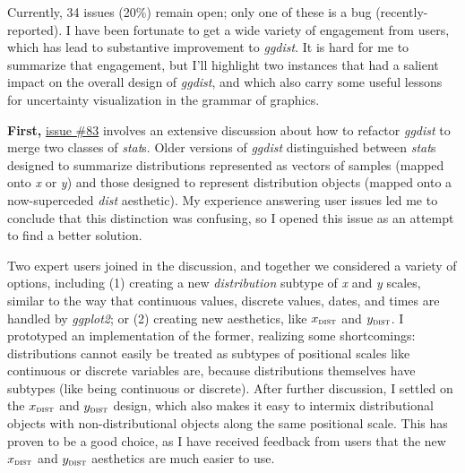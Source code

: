 \documentclass[journal]{vgtc}                     %
\begin{document}
Currently, 34 issues (20\%) remain open; only one of these is a bug (recently-reported). 
I have been fortunate to get a wide variety of engagement from users, which has lead to substantive improvement to \textit{ggdist}. It is hard for me to summarize that engagement, but I'll highlight two instances that had a salient impact on the overall design of \textit{ggdist}, and which also carry some useful lessons for uncertainty visualization in the grammar of graphics.

\textbf{First,} \href{https://github.com/mjskay/ggdist/issues/83}{issue \#83} involves an extensive discussion about how to refactor \textit{ggdist} to merge two classes of \textit{stat}s. Older versions of \textit{ggdist} distinguished between \textit{stat}s designed to summarize distributions represented as vectors of samples (mapped onto \textit{x} or \textit{y}) and those designed to represent distribution objects (mapped onto a now-superceded \textit{dist} aesthetic). My experience answering user issues led me to conclude that this distinction was confusing, so I opened this issue as an attempt to find a better solution. 

Two expert users joined in the discussion, and together we considered a variety of options, including (1) creating a new \textit{distribution} subtype of \textit{x} and \textit{y} scales, similar to the way that continuous values, discrete values, dates, and times are handled by \textit{ggplot2}; or (2) creating new aesthetics, like $x_\textsc{dist}$ and $y_\textsc{dist}$. I prototyped an implementation of the former, realizing some shortcomings: distributions cannot easily be treated as subtypes of positional scales like continuous or discrete variables are, because distributions themselves have subtypes (like being continuous or discrete). 
After further discussion, I settled on the $x_\textsc{dist}$ and $y_\textsc{dist}$ design, which also makes it easy to intermix distributional objects with non-distributional objects along the same positional scale. This has proven to be a good choice, as I have 
received feedback from users that the new $x_\textsc{dist}$ and $y_\textsc{dist}$ aesthetics are much easier to use.
\end{document}
